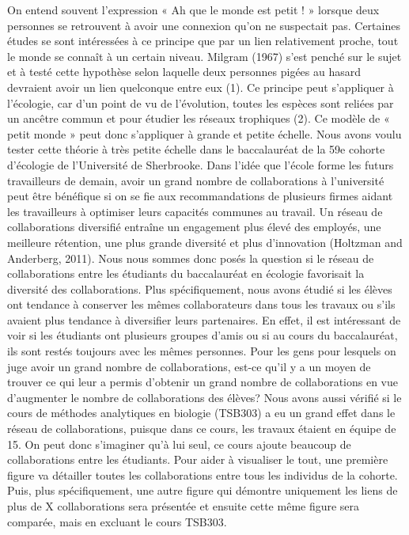\documentclass[9pt,twocolumn,twoside,]{pnas-new}
\begin{document}
On entend souvent l'expression « Ah que le monde est petit ! » lorsque
deux personnes se retrouvent à avoir une connexion qu'on ne suspectait
pas. Certaines études se sont intéressées à ce principe que par un lien
relativement proche, tout le monde se connaît à un certain niveau.
Milgram (1967) s'est penché sur le sujet et à testé cette hypothèse
selon laquelle deux personnes pigées au hasard devraient avoir un lien
quelconque entre eux (1). Ce principe peut s'appliquer à l'écologie, car
d'un point de vu de l'évolution, toutes les espèces sont reliées par un
ancêtre commun et pour étudier les réseaux trophiques (2). Ce modèle de
« petit monde » peut donc s'appliquer à grande et petite échelle. Nous
avons voulu tester cette théorie à très petite échelle dans le
baccalauréat de la 59e cohorte d'écologie de l'Université de Sherbrooke.
Dans l'idée que l'école forme les futurs travailleurs de demain, avoir
un grand nombre de collaborations à l'université peut être bénéfique si
on se fie aux recommandations de plusieurs firmes aidant les
travailleurs à optimiser leurs capacités communes au travail. Un réseau
de collaborations diversifié entraîne un engagement plus élevé des
employés, une meilleure rétention, une plus grande diversité et plus
d'innovation (Holtzman and Anderberg, 2011). Nous nous sommes donc posés
la question si le réseau de collaborations entre les étudiants du
baccalauréat en écologie favorisait la diversité des collaborations.
Plus spécifiquement, nous avons étudié si les élèves ont tendance à
conserver les mêmes collaborateurs dans tous les travaux ou s'ils
avaient plus tendance à diversifier leurs partenaires. En effet, il est
intéressant de voir si les étudiants ont plusieurs groupes d'amis ou si
au cours du baccalauréat, ils sont restés toujours avec les mêmes
personnes. Pour les gens pour lesquels on juge avoir un grand nombre de
collaborations, est-ce qu'il y a un moyen de trouver ce qui leur a
permis d'obtenir un grand nombre de collaborations en vue d'augmenter le
nombre de collaborations des élèves? Nous avons aussi vérifié si le
cours de méthodes analytiques en biologie (TSB303) a eu un grand effet
dans le réseau de collaborations, puisque dans ce cours, les travaux
étaient en équipe de 15. On peut donc s'imaginer qu'à lui seul, ce cours
ajoute beaucoup de collaborations entre les étudiants. Pour aider à
visualiser le tout, une première figure va détailler toutes les
collaborations entre tous les individus de la cohorte. Puis, plus
spécifiquement, une autre figure qui démontre uniquement les liens de
plus de X collaborations sera présentée et ensuite cette même figure
sera comparée, mais en excluant le cours TSB303.
\end{document}
